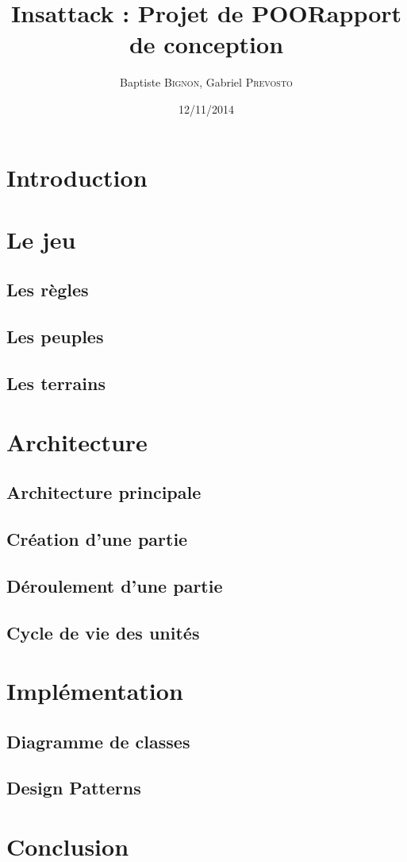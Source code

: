 \documentclass[12pt]{article}
\title{Insattack : Projet de POO\smallbreak Rapport de conception}
\author{Baptiste \textsc{Bignon}, Gabriel \textsc{Prevosto}}
\date{12/11/2014}
\begin{document}
\maketitle
\newpage

\tableofcontents
\renewcommand{\contentsname}{Sommaire}
\newpage


\section{Introduction}
\newpage

\section{Le jeu}
\subsection{Les règles}
\subsection{Les peuples}
\subsection{Les terrains}
\newpage

\section{Architecture}
\subsection{Architecture principale}
\subsection{Création d'une partie}
\subsection{Déroulement d'une partie}
\subsection{Cycle de vie des unités}
\newpage

\section{Implémentation}
\subsection{Diagramme de classes}
\subsection{Design Patterns}
\newpage

\section{Conclusion}
\end{document}
